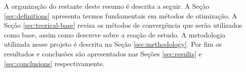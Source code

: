A organização do restante deste resumo é descrita a seguir. A Seção \ref{sec:definitions} apresenta termos fundamentais em métodos de otimização. A Seção \ref{sec:teorical-base} revisa os métodos de convergência que serão utilizados como base, assim como descreve sobre a reação de estudo. A metodologia utilizada nesse projeto é descrita na Seção \ref{sec:methodology}. Por fim os resultados e conclusões são apresentados nas Seções \ref{sec:results} e \ref{sec:conclusions} respectivamente.
